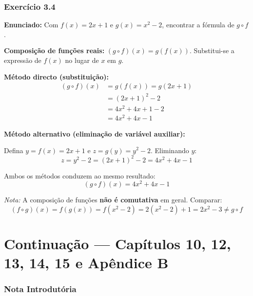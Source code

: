\documentclass[12pt,a4paper]{article}
\begin{document}
\section*{Exercício 3.4}

\textbf{Enunciado:} Com $f(x) = 2x+1$ e $g(x) = x^2-2$, encontrar a fórmula de $g \circ f$.

\begin{teoribox}
\textbf{Composição de funções reais:} $(g \circ f)(x) = g(f(x))$. Substitui-se a expressão de $f(x)$ no lugar de $x$ em $g$.
\end{teoribox}

\textbf{Método directo (substituição):}
\begin{align*}
(g \circ f)(x) &= g(f(x)) = g(2x+1) \\
&= (2x+1)^2 - 2 \\
&= 4x^2 + 4x + 1 - 2 \\
&= 4x^2 + 4x - 1
\end{align*}

\textbf{Método alternativo (eliminação de variável auxiliar):}

Defina $y = f(x) = 2x + 1$ e $z = g(y) = y^2 - 2$. Eliminando $y$:
\[
z = y^2 - 2 = (2x+1)^2 - 2 = 4x^2 + 4x - 1
\]

Ambos os métodos conduzem ao mesmo resultado:
\[
\boxed{(g \circ f)(x) = 4x^2 + 4x - 1}
\]

\begin{notabox}
\textit{Nota:} A composição de funções \textbf{não é comutativa} em geral. Comparar:
\[
(f \circ g)(x) = f(g(x)) = f(x^2 - 2) = 2(x^2 - 2) + 1 = 2x^2 - 3 \neq g \circ f
\]
\end{notabox}

\newpage
\part*{Continuação --- Capítulos 10, 12, 13, 14, 15 e Apêndice B}

\section*{Nota Introdutória}
\end{document}
